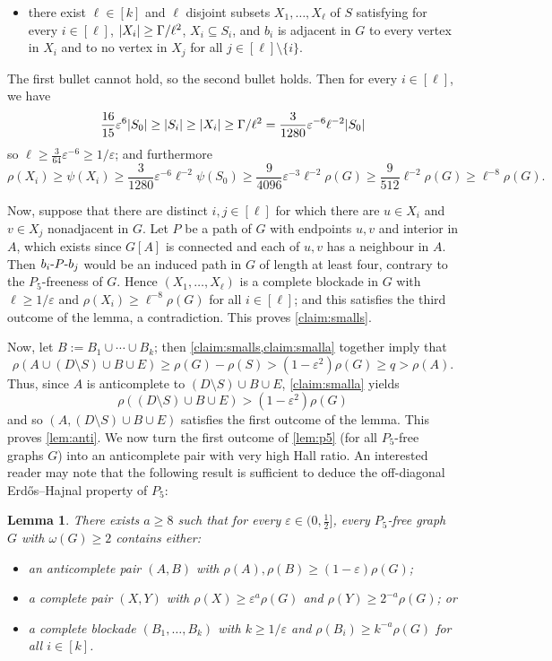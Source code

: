 \documentclass[11pt,reqno]{amsart}
\newtheorem{lemma}[theorem]{Lemma}
\let\oldendproof\endproof
\renewenvironment{proof}[1][\proofname]{%
	\oldproof[\normalfont\bfseries #1]%
}{\oldendproof}
\renewcommand{\qedsymbol}{$\blacksquare$}%
\newenvironment{subproof}[1][\normalfont\it Subproof]{%
	\renewcommand{\qedsymbol}{$\square$}%
	\begin{proof}[#1]%
	}{%
	\end{proof}%
}
\newcommand{\eps}{\varepsilon}
\renewcommand{\subset}{\subseteq}
\newcommand{\erh}{Erd\H{o}s--Hajnal}
\DeclarePairedDelimiter\abs{\lvert}{\rvert}%
\begin{document}
\begin{proof}
\begin{subproof}
\begin{itemize}
				\item there exist $\ell\in[k]$ and $\ell$ disjoint subsets $X_1,\ldots,X_\ell$ of $S$ satisfying for every $i\in[\ell]$, $\abs{X_i}\ge \Gamma/\ell^2$, $X_i\subset S_i$, and $b_i$ is adjacent in $G$ to every vertex in $X_i$ and to no vertex in $X_j$ for all $j\in[\ell]\setminus\{i\}$.
			\end{itemize}
			
			The first bullet cannot hold, so the second bullet holds. Then for every $i\in[\ell]$, we have
			\[\frac{16}{15}\eps^6\abs {S_0}\ge\abs{S_i}\ge\abs{X_i}\ge\Gamma/\ell^2=\frac3{1280}\eps^{-6}\ell^{-2}\abs{S_0}\]
			so $\ell\ge\frac3{64}\eps^{-6}\ge1/\eps$; and furthermore
			\[\rho(X_i)\ge\psi(X_i) \ge\frac3{1280}\eps^{-6}\ell^{-2}\psi(S_0)
			\ge\frac9{4096}\eps^{-3}\ell^{-2}\rho(G)
			\ge \frac9{512}\ell^{-2}\rho(G)
			\ge \ell^{-8}\rho(G).\]
			
			Now, suppose that there are distinct $i,j\in[\ell]$ for which there are $u\in X_i$ and $v\in X_j$ nonadjacent in $G$.
			Let $P$ be a path of $G$ with endpoints $u,v$ and interior in $A$, which exists since $G[A]$ is connected and each of $u,v$ has a neighbour in $A$.
			Then $b_i\text-P\text-b_j$ would be an induced path in $G$ of length at least four, contrary to the $P_5$-freeness of $G$.
			Hence $(X_1,\ldots,X_\ell)$ is a complete blockade in $G$ with $\ell\ge1/\eps$ and $\rho(X_i)\ge\ell^{-8}\rho(G)$ for all $i\in[\ell]$; and this satisfies the third outcome of the lemma, a contradiction.
			This proves \cref{claim:smalls}.
		\end{subproof}
		
		Now, let $B:=B_1\cup\cdots\cup B_k$; then \cref{claim:smalls,claim:smalla} together imply that
		\[\rho(A\cup(D\setminus S)\cup B\cup E)
		\ge \rho(G)-\rho(S)>(1-\eps^2)\rho(G)\ge q>\rho(A).\]
		Thus, since $A$ is anticomplete to $(D\setminus S)\cup B\cup E$, \cref{claim:smalla} yields
		\[\rho((D\setminus S)\cup B\cup E)>(1-\eps^2)\rho(G)\]
		and so $(A,(D\setminus S)\cup B\cup E)$ satisfies the first outcome of the lemma.
		This proves \cref{lem:anti}.
	\end{proof}
	We now turn the first outcome of \cref{lem:p5} (for all $P_5$-free graphs $G$) into an anticomplete pair with very high Hall ratio.
	An interested reader may note that the following result is sufficient to deduce the off-diagonal \erh{} property of $P_5$:
	\begin{lemma}
		\label{lem:1step}
		There exists $a\ge8$ such that for every $\eps\in(0,\frac12]$, every $P_5$-free graph $G$ with $\omega(G)\ge2$ contains either:
		\begin{itemize}
			\item an anticomplete pair $(A,B)$ with $\rho(A),\rho(B)\ge(1-\eps)\rho(G)$;
			
			\item a complete pair $(X,Y)$ with $\rho(X)\ge\eps^a\rho(G)$ and $\rho(Y)\ge2^{-a}\rho(G)$; or
			
			\item a complete blockade $(B_1,\ldots,B_k)$ with $k\ge1/\eps$ and $\rho(B_i)\ge k^{-a}\rho(G)$ for all $i\in[k]$.
		\end{itemize}
	\end{lemma}
\end{document}
